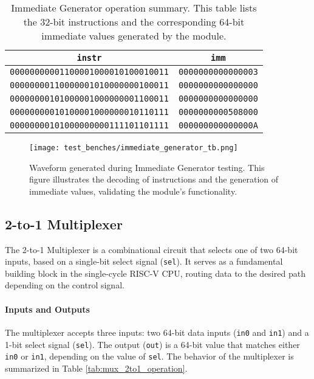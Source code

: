 \documentclass[12pt]{article}
\begin{document}
\begin{table}[ht!]
    \centering
    \renewcommand{\arraystretch}{1.1}
    \setlength{\tabcolsep}{6pt}
    \begin{tabular}{|c|c|}
        \hline
        \textbf{\texttt{instr}} & \textbf{\texttt{imm}} \\
        \hline
        \texttt{00000000001100001000010100010011} & \texttt{0000000000000003} \\
        \texttt{00000000110000001010000000100011} & \texttt{0000000000000000} \\
        \texttt{00000000101000001000000001100011} & \texttt{0000000000000000} \\
        \texttt{00000000010100001000000010110111} & \texttt{0000000000508000} \\
        \texttt{00000000101000000000111101101111} & \texttt{000000000000000A} \\
        \hline
    \end{tabular}
    \caption{Immediate Generator operation summary. This table lists the 32-bit instructions and the corresponding 64-bit immediate values generated by the module.}
    \label{tab:immediate_generator_results}
\end{table}

\begin{figure}[ht!]
    \centering
    \texttt{[image: test\_benches/immediate\_generator\_tb.png]}
    \caption{Waveform generated during Immediate Generator testing. This figure illustrates the decoding of instructions and the generation of immediate values, validating the module's functionality.}
    \label{fig:immediate_generator_waveform}
\end{figure}

\newpage

\subsection*{2-to-1 Multiplexer}

The 2-to-1 Multiplexer is a combinational circuit that selects one of two 64-bit inputs, based on a single-bit select signal (\texttt{sel}). It serves as a fundamental building block in the single-cycle RISC-V CPU, routing data to the desired path depending on the control signal.

\paragraph{Inputs and Outputs}
The multiplexer accepts three inputs: two 64-bit data inputs (\texttt{in0} and \texttt{in1}) and a 1-bit select signal (\texttt{sel}). The output (\texttt{out}) is a 64-bit value that matches either \texttt{in0} or \texttt{in1}, depending on the value of \texttt{sel}. The behavior of the multiplexer is summarized in Table \ref{tab:mux_2to1_operation}.
\end{document}

